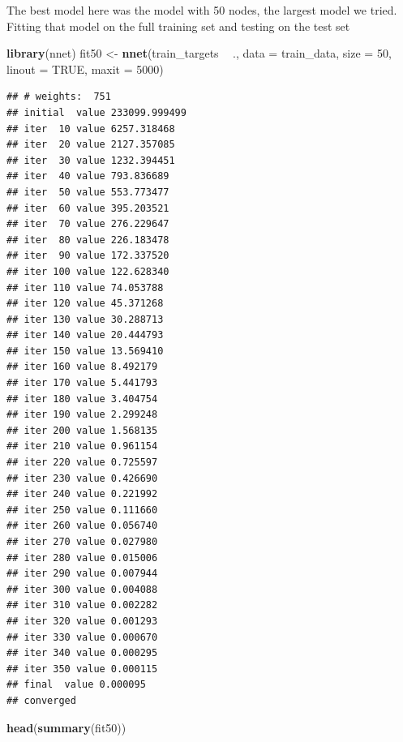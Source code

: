 \documentclass[10pt,ignorenonframetext,]{beamer}
\newenvironment{Shaded}{\begin{snugshade}}{\end{snugshade}}
\newcommand{\DataTypeTok}[1]{\textcolor[rgb]{0.13,0.29,0.53}{#1}}
\newcommand{\DecValTok}[1]{\textcolor[rgb]{0.00,0.00,0.81}{#1}}
\newcommand{\KeywordTok}[1]{\textcolor[rgb]{0.13,0.29,0.53}{\textbf{#1}}}
\newcommand{\NormalTok}[1]{#1}
\newcommand{\OperatorTok}[1]{\textcolor[rgb]{0.81,0.36,0.00}{\textbf{#1}}}
\newcommand{\OtherTok}[1]{\textcolor[rgb]{0.56,0.35,0.01}{#1}}
\newcommand{\StringTok}[1]{\textcolor[rgb]{0.31,0.60,0.02}{#1}}
\begin{document}
\begin{frame}[fragile]

The best model here was the model with 50 nodes, the largest model we
tried. Fitting that model on the full training set and testing on the
test set

\scriptsize

\begin{Shaded}
\begin{Highlighting}[]
\KeywordTok{library}\NormalTok{(nnet)}
\NormalTok{fit50 <-}\StringTok{ }\KeywordTok{nnet}\NormalTok{(train_targets }\OperatorTok{~}\StringTok{ }\NormalTok{., }\DataTypeTok{data =}\NormalTok{ train_data, }\DataTypeTok{size =} \DecValTok{50}\NormalTok{, }\DataTypeTok{linout =} \OtherTok{TRUE}\NormalTok{, }
    \DataTypeTok{maxit =} \DecValTok{5000}\NormalTok{)}
\end{Highlighting}
\end{Shaded}

\begin{verbatim}
## # weights:  751
## initial  value 233099.999499 
## iter  10 value 6257.318468
## iter  20 value 2127.357085
## iter  30 value 1232.394451
## iter  40 value 793.836689
## iter  50 value 553.773477
## iter  60 value 395.203521
## iter  70 value 276.229647
## iter  80 value 226.183478
## iter  90 value 172.337520
## iter 100 value 122.628340
## iter 110 value 74.053788
## iter 120 value 45.371268
## iter 130 value 30.288713
## iter 140 value 20.444793
## iter 150 value 13.569410
## iter 160 value 8.492179
## iter 170 value 5.441793
## iter 180 value 3.404754
## iter 190 value 2.299248
## iter 200 value 1.568135
## iter 210 value 0.961154
## iter 220 value 0.725597
## iter 230 value 0.426690
## iter 240 value 0.221992
## iter 250 value 0.111660
## iter 260 value 0.056740
## iter 270 value 0.027980
## iter 280 value 0.015006
## iter 290 value 0.007944
## iter 300 value 0.004088
## iter 310 value 0.002282
## iter 320 value 0.001293
## iter 330 value 0.000670
## iter 340 value 0.000295
## iter 350 value 0.000115
## final  value 0.000095 
## converged
\end{verbatim}

\begin{Shaded}
\begin{Highlighting}[]
\KeywordTok{head}\NormalTok{(}\KeywordTok{summary}\NormalTok{(fit50))}
\end{Highlighting}
\end{Shaded}


\end{frame}
\end{document}

